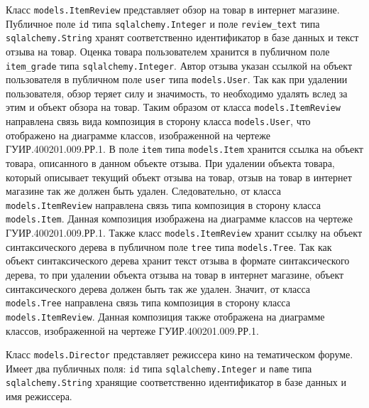 Класс \texttt{mo\-dels.ItemReview} представляет обзор на товар в интернет магазине. Публичное поле \texttt{id} типа \texttt{sqlalchemy.Integer} и поле \texttt{re\-vi\-ew\_text} типа \texttt{sqlalchemy.String} хранят соответственно идентификатор в базе данных и текст отзыва на товар. Оценка товара пользователем хранится в публичном поле \texttt{item\_grade} типа \texttt{sqlalchemy.Integer}. Автор отзыва указан ссылкой на объект пользователя в публичном поле \texttt{user} типа \texttt{mo\-dels.User}. Так как при удалении пользователя, обзор теряет силу и значимость, то необходимо удалять вслед за этим и объект обзора на товар. Таким образом от класса \texttt{mo\-dels.ItemReview} направлена связь вида композиция в сторону класса \texttt{mo\-dels.User}, что отображено на диаграмме классов, изображенной на чертеже ГУИР.400201.009.РР.1. В поле \texttt{item} типа \texttt{mo\-dels.Item} хранится ссылка на объект товара, описанного в данном объекте отзыва. При удалении объекта товара, который описывает текущий объект отзыва на товар, отзыв на товар в интернет магазине так же должен быть удален. Следовательно, от класса \texttt{mo\-dels.ItemReview} направлена связь типа композиция в сторону класса \texttt{mo\-dels.Item}. Данная композиция изображена на диаграмме классов на чертеже ГУИР.400201.009.РР.1. Также класс \texttt{mo\-dels.ItemReview} хранит ссылку на объект синтаксического дерева в публичном поле \texttt{tree} типа \texttt{mo\-dels.Tree}. Так как объект синтаксического дерева хранит текст отзыва в формате синтаксического дерева, то при удалении объекта отзыва на товар в интернет магазине, объект синтаксического дерева должен быть так же удален. Значит, от класса \texttt{mo\-dels.Tree} направлена связь типа композиция в сторону класса \texttt{mo\-dels.ItemReview}. Данная композиция также отображена на диаграмме классов, изображенной на чертеже ГУИР.400201.009.РР.1.

Класс \texttt{mo\-dels.Director} представляет режиссера кино на тематическом форуме. Имеет два публичных поля: \texttt{id} типа \texttt{sqlalchemy.Integer} и \texttt{name} типа \texttt{sqlalchemy.String} хранящие соответственно идентификатор в базе данных и имя режиссера.

